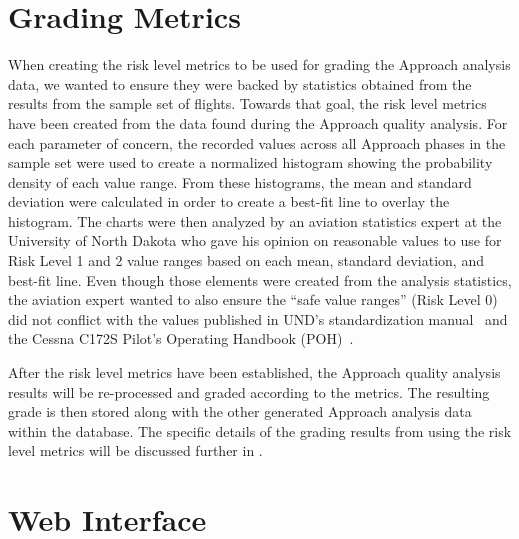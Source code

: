     
%    
    

\section{Grading Metrics}
    
    When creating the risk level metrics to be used for grading the Approach analysis data, we wanted to ensure they were backed by statistics obtained from the results from the sample set of flights.  Towards that goal, the risk level metrics have been created from the data found during the Approach quality analysis.  For each parameter of concern, the recorded values across all Approach phases in the sample set were used to create a normalized histogram showing the probability density of each value range.  From these histograms, the mean and standard deviation were calculated in order to create a best-fit line to overlay the histogram.  The charts were then analyzed by an aviation statistics expert at the University of North Dakota who gave his opinion on reasonable values to use for Risk Level 1 and 2 value ranges based on each mean, standard deviation, and best-fit line.  Even though those elements were created from the analysis statistics, the aviation expert wanted to also ensure the ``safe value ranges'' (Risk Level 0) did not conflict with the values published in UND's standardization manual~\cite{und_flight_manual} and the Cessna C172S Pilot's Operating Handbook (POH)~\cite{und_poh}.
    
    After the risk level metrics have been established, the Approach quality analysis results will be re-processed and graded according to the metrics.  The resulting grade is then stored along with the other generated Approach analysis data within the database.  The specific details of the grading results from using the risk level metrics will be discussed further in .
    
    
\section{Web Interface}
    
